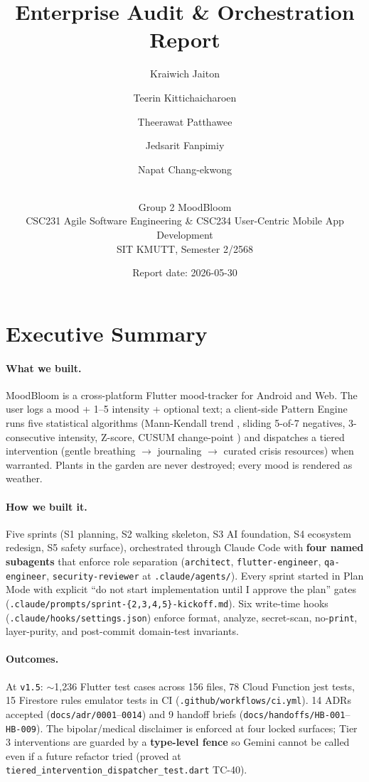 \documentclass[11pt,a4paper]{article}
\title{Enterprise Audit \& Orchestration Report}
\author{
  Kraiwich Jaiton \and
  Teerin Kittichaicharoen \and
  Theerawat Patthawee \and
  Jedsarit Fanpimiy \and
  Napat Chang-ekwong \and
  \\[1ex]
  \small Group 2 MoodBloom \\
  \small CSC231 Agile Software Engineering \& CSC234 User-Centric Mobile App Development \\
  \small SIT KMUTT, Semester 2/2568
}
\date{Report date: 2026-05-30}
\begin{document}
\maketitle
\thispagestyle{fancy}

\section*{Executive Summary}

\paragraph{What we built.} MoodBloom is a cross-platform Flutter mood-tracker
for Android and Web. The user logs a mood + 1--5 intensity + optional text;
a client-side Pattern Engine runs five statistical algorithms (Mann-Kendall
trend \cite{mann1945trend,kendall1975rank}, sliding 5-of-7 negatives,
3-consecutive intensity, Z-score, CUSUM change-point \cite{page1954cusum})
and dispatches a tiered intervention (gentle breathing $\to$ journaling
$\to$ curated crisis resources) when warranted. Plants in the garden are
never destroyed; every mood is rendered as weather.

\paragraph{How we built it.} Five sprints (S1 planning, S2 walking
skeleton, S3 AI foundation, S4 ecosystem redesign, S5 safety surface),
orchestrated through Claude Code with \textbf{four named subagents} that
enforce role separation (\texttt{architect}, \texttt{flutter-engineer},
\texttt{qa-engineer}, \texttt{security-reviewer} at
\texttt{.claude/agents/}). Every sprint started in Plan Mode with explicit
``do not start implementation until I approve the plan'' gates
(\texttt{.claude/prompts/sprint-\{2,3,4,5\}-kickoff.md}). Six write-time
hooks (\texttt{.claude/hooks/settings.json}) enforce format, analyze,
secret-scan, no-\texttt{print}, layer-purity, and post-commit
domain-test invariants.

\paragraph{Outcomes.} At \texttt{v1.5}: $\sim$1{,}236 Flutter test cases
across 156 files, 78 Cloud Function jest tests, 15 Firestore rules
emulator tests in CI (\texttt{.github/workflows/ci.yml}). 14 ADRs
accepted (\texttt{docs/adr/0001}--\texttt{0014}) and 9 handoff briefs
(\texttt{docs/handoffs/HB-001}--\texttt{HB-009}). The bipolar/medical
disclaimer is enforced at four locked surfaces; Tier 3 interventions
are guarded by a \textbf{type-level fence} so Gemini cannot be called
even if a future refactor tried (proved at
\texttt{tiered\_intervention\_dispatcher\_test.dart} TC-40).
\end{document}
